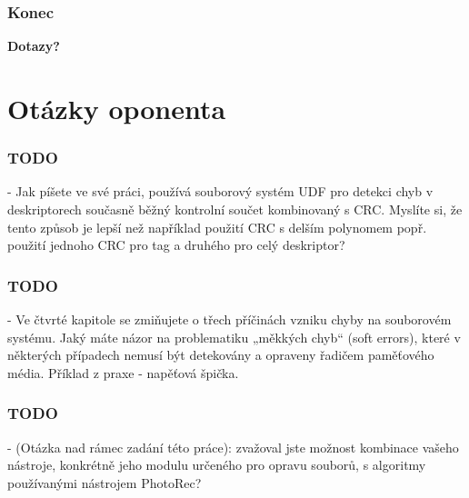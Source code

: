 \documentclass[aspectratio=169]{beamer}
\begin{document}
		\begin{frame}
			\frametitle{Konec}
			\center
			\vspace{40 pt}
			\Huge\textbf{Dotazy?}
		\end{frame}
    \appendix 
    \setcounter{showProgressBar}{0}
    \section{Otázky oponenta}
        \begin{frame}
            \frametitle{TODO}
            - Jak píšete ve své práci, používá souborový systém UDF pro detekci chyb v deskriptorech současně běžný kontrolní součet kombinovaný s CRC. Myslíte si, že tento způsob je lepší než například použití CRC s delším polynomem popř. použití jednoho CRC pro tag a druhého pro celý deskriptor?
        \end{frame}
        \begin{frame}
            \frametitle{TODO}
            - Ve čtvrté kapitole se zmiňujete o třech příčinách vzniku chyby na souborovém systému. Jaký máte názor na problematiku „měkkých chyb“ (soft errors), které v některých případech nemusí být detekovány a opraveny řadičem paměťového média. Příklad z praxe - napěťová špička.
        \end{frame}
        \begin{frame}
            \frametitle{TODO}
            - (Otázka nad rámec zadání této práce): zvažoval jste možnost kombinace vašeho nástroje, konkrétně jeho modulu určeného pro opravu souborů, s algoritmy používanými nástrojem PhotoRec?

        \end{frame}
\end{document}
